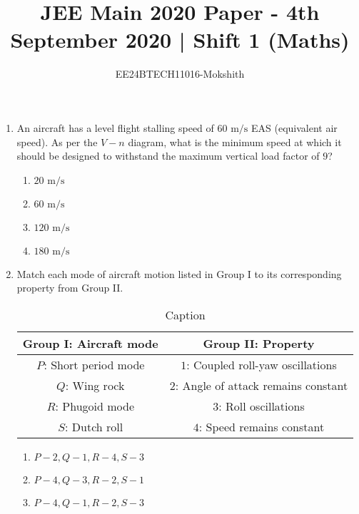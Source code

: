 \documentclass[journal]{IEEEtran}
\begin{document}

\title{JEE Main 2020 Paper - 4th September 2020 | Shift 1 (Maths)}
\author{EE24BTECH11016-Mokshith}
{\let\newpage\relax\maketitle}
\renewcommand{\thefigure}{\theenumi}
\renewcommand{\thetable}{\theenumi}
\setlength{\intextsep}{10pt} %
\renewcommand{\thetable}{\theenumi}

\begin{enumerate}[start=35]
\item An aircraft has a level flight stalling speed of $60 \text{ m/s}$ EAS (equivalent air speed). As per the $V-n$ diagram, what is the minimum speed at which it should be designed to withstand the maximum vertical load factor of $9$?
\begin{enumerate}
    \item $20 \text{ m/s}$
    \item $60 \text{ m/s}$
    \item $120 \text{ m/s}$
    \item $180 \text{ m/s}$
\end{enumerate}
\item Match each mode of aircraft motion listed in Group I to its corresponding property from Group II.
\begin{table}[h]
    \centering
    \begin{tabular}{|c|c|}
    \hline
      Group I: Aircraft mode & Group II: Property\\
      \hline
        $P$: Short period mode& $1$: Coupled roll-yaw oscillations\\
        \hline
        $Q$: Wing rock & $2$: Angle of attack remains constant\\
        \hline
        $R$: Phugoid mode & $3$: Roll oscillations\\
        \hline
        $S$: Dutch roll& $4$: Speed remains constant\\
        \hline
    \end{tabular}
    \caption{Caption}
\label{tab:my_label}
\end{table}
\begin{enumerate}
    \item $P-2, Q-1, R-4, S-3$
    \item $P-4, Q-3, R-2, S-1$
    \item $P-4, Q-1, R-2, S-3$

\end{enumerate}
\end{enumerate}
\end{document}
